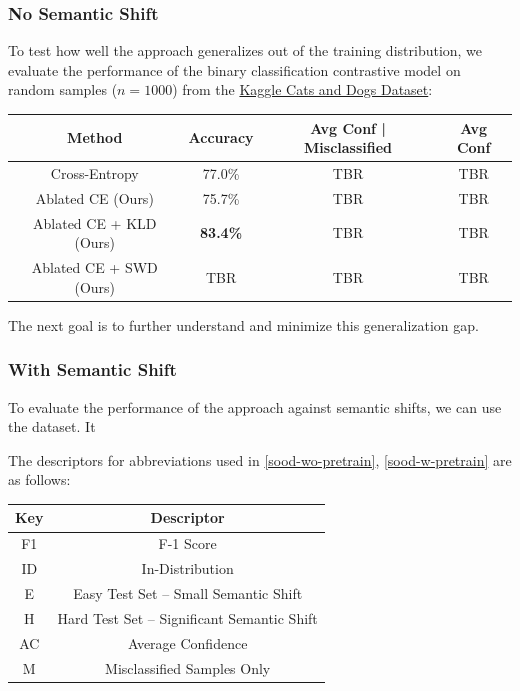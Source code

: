 \documentclass{article}
\theoremstyle{plain}
\theoremstyle{definition}
\theoremstyle{remark}
\begin{document}
\subsubsection{No Semantic Shift}
To test how well the approach generalizes out of the training distribution, we evaluate the performance of the binary classification contrastive model on random samples ($n=1000$) from the \href{https://www.microsoft.com/en-us/download/details.aspx?id=54765}{Kaggle Cats and Dogs Dataset}:
\begin{table}[h]
	\centering
	\begin{tabular}{c|ccc}
		\toprule
		\textbf{Method} & \textbf{Accuracy} & \textbf{Avg Conf | Misclassified} & \textbf{Avg Conf} \\
		\midrule
		Cross-Entropy 		& 77.0\% 	& TBR & TBR \\
		Ablated CE (Ours) 	& 75.7\% 	& TBR & TBR \\
		Ablated CE + KLD (Ours) & \bf 83.4\% 	& TBR & TBR \\
		Ablated CE + SWD (Ours) & TBR & TBR & TBR \\
		\bottomrule
	\end{tabular}
\end{table}

The next goal is to further understand and minimize this generalization gap.

\subsubsection{With Semantic Shift}

To evaluate the performance of the approach against semantic shifts, we can use the \citet{soodimagenet} dataset. It 

The descriptors for abbreviations used in \ref{sood-wo-pretrain}, \ref{sood-w-pretrain} are as follows:
\begin{table}[h]
	\centering
	\begin{tabular}{c|c}
		\toprule
		\textbf{Key} & \textbf{Descriptor} \\
		\midrule
		F1 & F-1 Score \\
		ID & In-Distribution \\ 
		E & Easy Test Set -- Small Semantic Shift \\
		H & Hard Test Set -- Significant Semantic Shift \\
		AC & Average Confidence \\
		M & Misclassified Samples Only \\
		\bottomrule
	\end{tabular}
\end{table}
\end{document}
